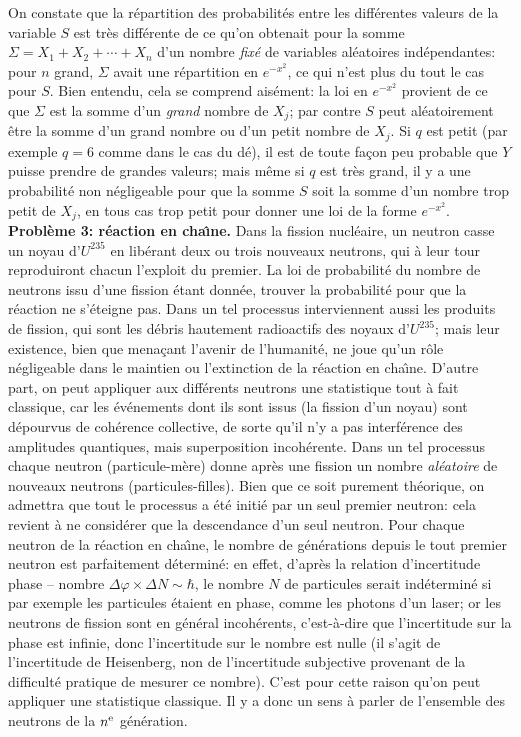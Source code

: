 On constate que la r\'epartition des probabilit\'es
entre les diff\'erentes valeurs de la variable $S$ est tr\`es diff\'erente
de ce  qu'on obtenait pour  la somme $\Sigma = X_1 + X_2 + \cdots +
X_n$ d'un nombre {\it fix\'e} de variables al\'eatoires ind\'ependantes:
pour $n$ grand, $\Sigma$  avait une r\'epartition en  $e^{-x^2}$, ce qui
n'est plus du tout le cas pour $S$. Bien entendu, cela se comprend
ais\'ement: la loi en $e^{-x^2}$ provient  de ce que $\Sigma$ est la 
somme d'un {\it grand} nombre de $X_j$; par contre $S$ peut
al\'eatoirement \^etre la somme d'un grand nombre ou  d'un petit nombre 
de $X_j$. Si $q$ est petit (par exemple $q=6$ comme dans le cas du 
d\'e), il est de toute fa\c{c}on peu probable que $Y$ puisse prendre de
grandes valeurs; mais m\^eme si $q$ est tr\`es grand, il y a une
probabilit\'e non n\'egligeable pour que la somme $S$ soit la somme d'un
nombre trop petit de $X_j$, en tous cas trop petit pour donner une loi de
la forme $e^{-x^2}$. 
\bigskip
{\bf Probl\`eme 3: r\'eaction en cha{\^\i}ne.} Dans la fission nucl\'eaire, 
un neutron casse un noyau d'$U^{235}$ en lib\'erant deux ou trois
nouveaux neutrons, qui \`a leur tour reproduiront chacun l'exploit du
premier. 
\smallskip
La loi de probabilit\'e du nombre de neutrons issu d'une fission \'etant
donn\'ee, trouver la probabilit\'e pour que la r\'eaction ne s'\'eteigne 
pas. 
\medskip
Dans un tel processus interviennent aussi les produits de fission,
qui sont les d\'ebris hautement radioactifs des noyaux d'$U^{235}$; 
mais leur existence,  bien que mena\c{c}ant l'avenir de l'humanit\'e, ne
joue qu'un r\^ole n\'egligeable dans le maintien ou l'extinction de la
r\'eaction en cha{\^\i}ne.  D'autre part,  on peut appliquer aux diff\'erents
neutrons  une statistique tout \`a fait classique,  car les \'ev\'enements 
dont ils sont issus (la fission d'un noyau) sont d\'epourvus de 
coh\'erence collective,  de sorte qu'il n'y a pas interf\'erence
des amplitudes quantiques,  mais superposition incoh\'erente. 
\medskip
Dans un tel processus chaque neutron (particule-m\`ere) donne apr\`es 
une fission un nombre {\it al\'eatoire} de nouveaux neutrons
(particules-filles). Bien que ce soit purement th\'eorique, on 
admettra que tout le processus a \'et\'e initi\'e par un seul premier 
neutron: cela revient \`a ne consid\'erer que la descendance d'un seul
neutron. 
\smallskip
{ 
Pour chaque neutron de la r\'eaction en cha{\^\i}ne, le nombre 
de g\'en\'erations depuis le tout premier neutron est parfaitement 
d\'etermin\'e: en effet, d'apr\`es la relation d'incertitude
phase -- nombre $\Delta\varphi\times\Delta N \sim \hbar$, le nombre
$N$ de particules serait ind\'etermin\'e si par exemple les particules
\'etaient en phase, comme les photons d'un laser; or les neutrons de
fission sont en g\'en\'eral incoh\'erents, c'est-\`a-dire que l'incertitude
sur la phase est infinie, donc l'incertitude sur le nombre est nulle
(il s'agit de l'incertitude de Heisenberg, non de l'incertitude subjective
provenant de la difficult\'e pratique de mesurer ce nombre).
C'est pour cette raison qu'on peut appliquer une statistique
classique. Il y a donc un sens \`a parler de l'ensemble des neutrons de 
la $n^{\rm e}$ g\'en\'eration. } 
